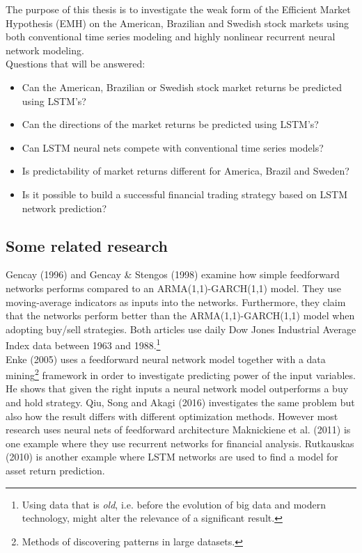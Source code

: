 \documentclass[12pt, letterpaper]{amsart}%
\begin{document}
The purpose of this thesis is to investigate the weak form of the Efficient Market Hypothesis (EMH) on the American, Brazilian and Swedish stock markets using both conventional time series modeling and highly nonlinear recurrent neural network modeling.
\\

Questions that will be answered:
\\

\begin{itemize}
\item Can the American, Brazilian or Swedish stock market returns be predicted using LSTM's?
\item Can the directions of the market returns be predicted using LSTM's?
\item Can LSTM neural nets compete with conventional time series models?
\item Is predictability of market returns different for America, Brazil and Sweden?
\item Is it possible to build a successful financial trading strategy based on LSTM network prediction?
\end{itemize}
\vspace{0.5cm}

\subsection{Some related research}
Gencay (1996) and Gencay \& Stengos (1998) examine how simple feedforward networks performs compared to an ARMA(1,1)-GARCH(1,1) model. They use moving-average indicators as inputs into the networks. Furthermore, they claim that the networks perform better than the ARMA(1,1)-GARCH(1,1) model when adopting buy/sell strategies. Both articles use daily Dow Jones Industrial Average Index data between 1963 and 1988.\footnote{Using data that is \textit{old}, i.e. before the evolution of big data and modern technology, might alter the relevance of a significant result.}
\\

Enke (2005) uses a feedforward neural network model together with a data mining\footnote{Methods of discovering patterns in large datasets.} framework in order to investigate predicting power of the input variables. He shows that given the right inputs a neural network model outperforms a buy and hold strategy. Qiu, Song and Akagi (2016) investigates the same problem but also how the result differs with different optimization methods. However most research uses neural nets of feedforward architecture Maknickiene et al. (2011) is one example where they use recurrent networks for financial analysis. Rutkauskas (2010) is another example where LSTM networks are used to find a model for asset return prediction.
\\
\end{document}
